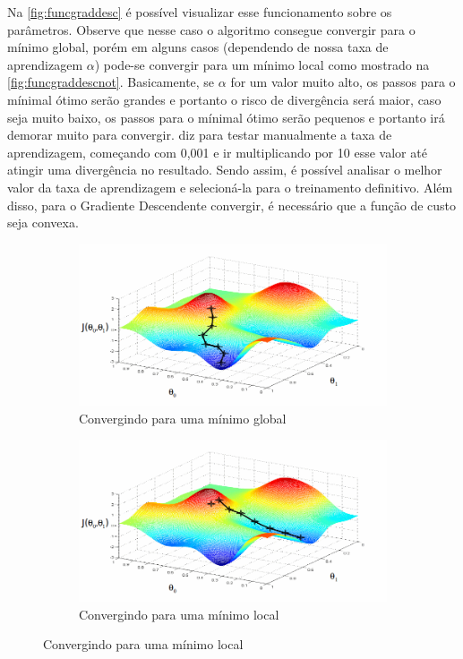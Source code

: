 Na \autoref{fig:funcgraddesc} é possível visualizar esse funcionamento sobre os parâmetros. Observe que nesse caso o algoritmo consegue convergir para o mínimo global, porém em alguns casos (dependendo de nossa taxa de aprendizagem $ \alpha $) pode-se convergir para um mínimo local como mostrado na \autoref{fig:funcgraddescnot}. Basicamente, se $\alpha$ for um valor muito alto, os passos para o mínimal ótimo serão grandes e portanto o risco de divergência será maior, caso seja muito baixo, os passos para o mínimal ótimo serão pequenos e portanto irá demorar muito para convergir.  diz para testar manualmente a taxa de aprendizagem, começando com 0,001 e ir multiplicando por 10 esse valor até atingir uma divergência no resultado. Sendo assim, é possível analisar o melhor valor da taxa de aprendizagem e selecioná-la para o treinamento definitivo. Além disso, para o Gradiente Descendente convergir, é necessário que a função de custo seja convexa.

\begin{figure}
  \caption{Funcionamento do Gradiente Descendente}
  \begin{subfigure}[htb]{0.5\textwidth} 
    \includegraphics[width=\textwidth]{img/funcgraddesc1}
    \caption{Convergindo para uma mínimo global} \label{fig:funcgraddesc}
  \end{subfigure}
  \begin{subfigure}[htb]{0.5\textwidth} 
    \includegraphics[width=\textwidth]{img/funcgraddesc2}
    \caption{Convergindo para uma mínimo local} \label{fig:funcgraddescnot}
  \end{subfigure}

\end{figure}

